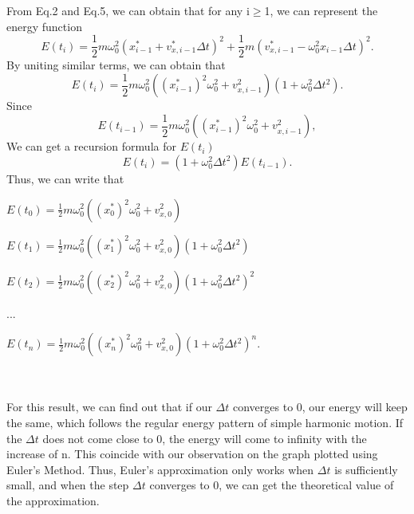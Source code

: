 \documentclass[12pt]{report}
\begin{document}
From Eq.2 and Eq.5, we can obtain that for any i$\ge$1, we can represent the energy function 
\begin{equation}
    E(t_{i})=\frac{1}{2}m\omega_{0}^2(x_{i-1}^*+v_{x,i-1}^*\Delta t)^2+\frac{1}{2}m(v_{x,i-1}^*-\omega_{0}^2x_{i-1}\Delta t)^2.
\end{equation}
By uniting similar terms, we can obtain that
\begin{equation}
    E(t_{i})=\frac{1}{2}m\omega_{0}^2((x_{i-1}^*)^2\omega_{0}^2+v_{x,i-1}^2)(1+\omega_{0}^2\Delta t^2).
\end{equation}
Since 
\begin{equation}
    E(t_{i-1})=\frac{1}{2}m\omega_{0}^2((x_{i-1}^*)^2\omega_{0}^2+v_{x,i-1}^2),
\end{equation}
We can get a recursion formula for $E(t_i)$
\begin{equation}
    E(t_{i})=(1+\omega_{0}^2\Delta t^2)E(t_{i-1}).
\end{equation}
Thus, we can write that 
\newline\centerline{$E(t_{0})=\frac{1}{2}m\omega_{0}^2((x_{0}^*)^2\omega_{0}^2+v_{x,0}^2)$}
\newline\centerline{$E(t_{1})=\frac{1}{2}m\omega_{0}^2((x_{1}^*)^2\omega_{0}^2+v_{x,0}^2)(1+\omega_{0}^2\Delta t^2)$}
\newline\centerline{$E(t_{2})=\frac{1}{2}m\omega_{0}^2((x_{2}^*)^2\omega_{0}^2+v_{x,0}^2)(1+\omega_{0}^2\Delta t^2)^2$}
\newline\centerline{...}
\newline\centerline{$E(t_{n})=\frac{1}{2}m\omega_{0}^2((x_{n}^*)^2\omega_{0}^2+v_{x,0}^2)(1+\omega_{0}^2\Delta t^2)^n.$}\\~\\
For this result, we can find out that if our $\Delta t$ converges to 0, our energy will keep the same, which follows the regular energy pattern of simple harmonic motion. If the $\Delta t$ does not come close to 0, the energy will come to infinity with the increase of n. This coincide with our observation on the graph plotted using Euler's Method. Thus, Euler's approximation only works when $\Delta t$ is sufficiently small, and when the step $\Delta t$ converges to 0, we can get the theoretical value of the approximation.
\clearpage
\end{document}
